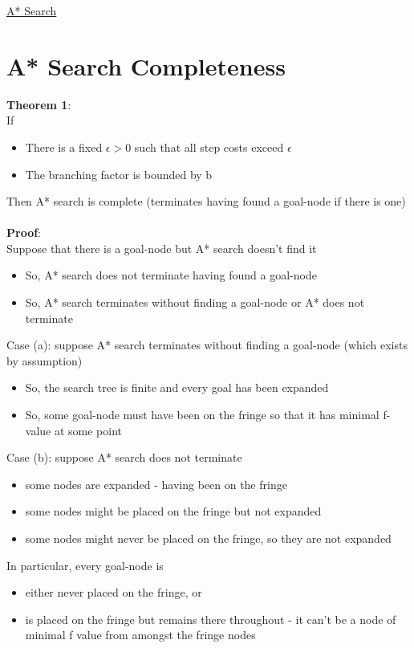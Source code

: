 \documentclass{article}[18pt]
\begin{document}
\begin{center}
\underline{\huge A* Search}
\end{center}
\section{A* Search Completeness}
\textbf{Theorem 1}:\\
If
\begin{itemize}
	\item There is a fixed $\epsilon>0$ such that all step costs exceed $\epsilon$
	\item The branching factor is bounded by b
\end{itemize}
Then A* search is complete (terminates having found a goal-node if there is one)\\
\\
\textbf{Proof}:\\
Suppose that there is a goal-node but A* search doesn't find it
\begin{itemize}
	\item So, A* search does not terminate having found a goal-node
	\item So, A* search terminates without finding a goal-node or A* does not terminate
\end{itemize}
Case (a): suppose A* search terminates without finding a goal-node (which exists by assumption)
\begin{itemize}
	\item So, the search tree is finite and every goal has been expanded
	\item So, some goal-node must have been on the fringe so that it has minimal f-value at some point
\end{itemize}
Case (b): suppose A* search does not terminate
\begin{itemize}
	\item some nodes are expanded - having been on the fringe
	\item some nodes might be placed on the fringe but not expanded
	\item some nodes might never be placed on the fringe, so they are not expanded
\end{itemize}
In particular, every goal-node is
\begin{itemize}
	\item either never placed on the fringe, or
	\item is placed on the fringe but remains there throughout - it can't be a node of minimal f value from amongst the fringe nodes
\end{itemize}
\end{document}
